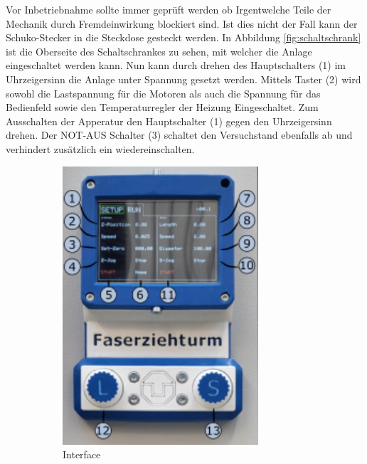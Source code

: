 Vor Inbetriebnahme sollte immer geprüft werden ob Irgentwelche Teile der Mechanik durch Fremdeinwirkung blockiert sind. Ist dies nicht der Fall kann der Schuko-Stecker in die Steckdose gesteckt werden. In Abbildung \ref{fig:schaltschrank} ist die Oberseite des Schaltschrankes zu sehen, mit welcher die Anlage eingeschaltet werden kann. Nun kann durch drehen des Hauptschalters (1) im Uhrzeigersinn  die Anlage unter Spannung gesetzt werden. Mittels Taster (2) wird sowohl die Lastspannung für die Motoren als auch die Spannung für das Bedienfeld sowie den Temperaturregler der Heizung Eingeschaltet. Zum Ausschalten der Apperatur den Hauptschalter (1) gegen den Uhrzeigersinn drehen. Der NOT-AUS Schalter (3) schaltet den Versuchstand ebenfalls ab und verhindert zusätzlich ein wiedereinschalten.
\newpage
\begin{figure}[!h]
    \centering
    \begin{subfigure}[]{.45\textwidth}
        \centering
        \includegraphics[width=0.8\textwidth]{Abbildungen/Manuel/Interface_01.png}
        \caption{Interface}
        \label{fig:interface}
    \end{subfigure}
    \begin{subfigure}[]{.45\textwidth}

\end{subfigure}
\end{figure}

